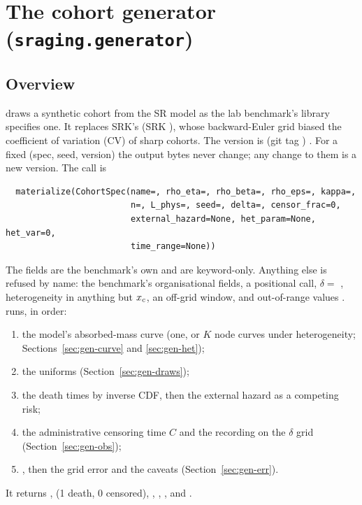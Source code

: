 \section{The cohort generator (\texttt{sraging.generator})}\label{sec:gen}

\subsection{Overview}\label{sec:gen-overview}

 draws a synthetic cohort from the SR model as the lab benchmark's library specifies one. It
replaces SRK's  (SRK ), whose backward-Euler grid biased the
coefficient of variation (CV) of sharp cohorts. The version is  (git tag )
. For a fixed (spec, seed, version) the output bytes never change; any change to
them is a new version. The call  is
\begin{verbatim}
  materialize(CohortSpec(name=, rho_eta=, rho_beta=, rho_eps=, kappa=,
                         n=, L_phys=, seed=, delta=, censor_frac=0,
                         external_hazard=None, het_param=None, het_var=0,
                         time_range=None))
\end{verbatim}
 The fields are the benchmark's own and are keyword-only. Anything else
is refused by name: the benchmark's organisational fields, a positional call, $\delta=$ , heterogeneity in
anything but $x_c$, an off-grid window, and out-of-range values .
 runs, in order:
\begin{enumerate}[nosep]
  \item the model's absorbed-mass curve (one, or $K$ node curves under heterogeneity; Sections~\ref{sec:gen-curve}
    and \ref{sec:gen-het});
  \item the uniforms (Section~\ref{sec:gen-draws});
  \item the death times by inverse CDF, then the external hazard as a competing risk;
  \item the administrative censoring time $C$ and the recording on the $\delta$ grid (Section~\ref{sec:gen-obs});
  \item {}, then the grid error and the caveats (Section~\ref{sec:gen-err}).
\end{enumerate}
It returns ,  (1 death, 0 censored), ,
, ,  and 
.


